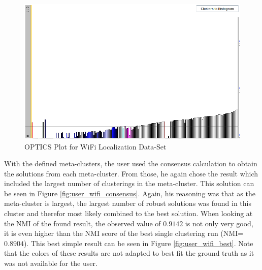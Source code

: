 \documentclass[
	a4paper,
	english,
	twoside,
	openright,               
	11pt                            
	]{report}
\begin{document}
\begin{figure}[h]
	\centering
	\includegraphics[scale=.5]{user_wifi_optics}
	\caption{OPTICS Plot for WiFi Localization Data-Set}
	\label{fig:user_wifi_optics}
\end{figure}

With the defined meta-clusters, the user used the consensus calculation to obtain the solutions from each meta-cluster. From those, he again chose the result which included the largest number of clusterings in the meta-cluster. This solution can be seen in Figure \ref{fig:user_wifi_consensus}. Again, his reasoning was that as the meta-cluster is largest, the largest number of robust solutions was found in this cluster and therefor most likely combined to the best solution. When looking at the NMI of the found result, the observed value of $0.9142$ is not only very good, it is even higher than the NMI score of the best single clustering run (NMI=$0.8904$). This best simple result can be seen in Figure \ref{fig:user_wifi_best}. Note that the colors of these results are not adapted to best fit the ground truth as it was not available for the user.
\end{document}
